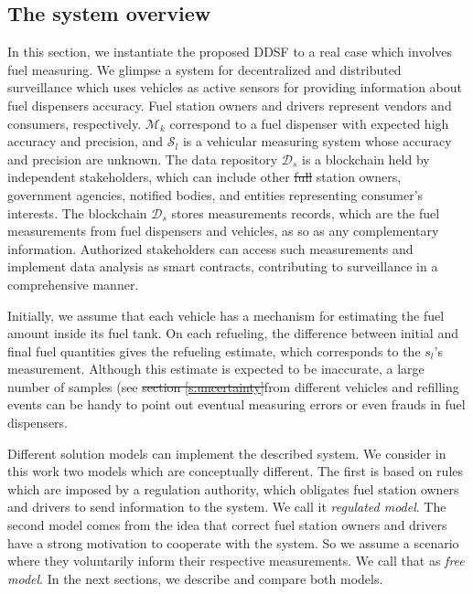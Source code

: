 \documentclass[sigplan]{acmart}
\providecommand{\DIFadd}[1]{{\protect\color{blue}\uwave{#1}}} %
\providecommand{\DIFdel}[1]{{\protect\color{red}\sout{#1}}}                      %
\providecommand{\DIFaddbegin}{} %
\providecommand{\DIFaddend}{} %
\providecommand{\DIFdelbegin}{} %
\providecommand{\DIFdelend}{} %
\begin{document}
\DIFaddend \subsection{The system overview}
In this section, we instantiate the proposed DDSF to a real case which involves fuel measuring.
We glimpse a system for decentralized and distributed surveillance which uses vehicles as active sensors for providing information about fuel dispensers accuracy.
Fuel station owners and drivers represent vendors and consumers, respectively.
$\mathcal{M}_k$ correspond to a fuel dispenser with expected high accuracy and precision, and $\mathcal{S}_l$ is a vehicular measuring system whose accuracy and precision are unknown.
The data repository $\mathcal{D}_s$ is a blockchain held by independent stakeholders, which can include other \DIFdelbegin \DIFdel{full }\DIFdelend \DIFaddbegin \DIFadd{fuel }\DIFaddend station owners, government agencies, notified bodies, and entities representing consumer's interests.
The blockchain $\mathcal{D}_s$ stores measurements records, which are the fuel measurements from fuel dispensers and vehicles, as so as any complementary information.
Authorized stakeholders can access such measurements and implement data analysis as smart contracts, contributing to surveillance in a comprehensive manner.

Initially, we assume that each vehicle has a mechanism for estimating the fuel amount inside its fuel tank.
On each refueling, the difference between initial and final fuel quantities gives the refueling estimate, which corresponds to the $s_l$'s measurement.
Although this estimate is expected to be inaccurate, a large number of samples (see \DIFdelbegin \DIFdel{section \ref{s:uncertainty}}\DIFdelend \DIFaddbegin \DIFadd{Section \ref{s:uncertainty}) }\DIFaddend from different vehicles and refilling events can be handy to point out eventual measuring errors or even frauds in fuel dispensers.

Different solution models can implement the described system.
We consider in this work two models which are conceptually different.
The first is based on rules which are imposed by a regulation authority, which obligates fuel station owners and drivers to send information to the system. We call it \emph{regulated model}.
The second model comes from the idea that correct fuel station owners and drivers have a strong motivation to cooperate with the system.
So we assume a scenario where they voluntarily inform their respective measurements.
We call that as \emph{free model}.
In the next sections, we describe and compare both models.
\end{document}
